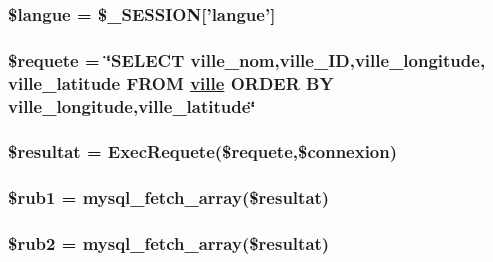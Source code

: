 \hypertarget{distance_8php_a1}{
\subsubsection[\$langue]{\setlength{\rightskip}{0pt plus 5cm}\$langue = \$\_\-SESSION\mbox{[}'langue'\mbox{]}}}
\label{distance_8php_a1}


\hypertarget{distance_8php_a5}{
\subsubsection[\$requete]{\setlength{\rightskip}{0pt plus 5cm}\$requete = \char`\"{}SELECT ville\_\-nom,ville\_\-ID,ville\_\-longitude, ville\_\-latitude FROM \hyperlink{apa__zone_8php_a33}{ville} ORDER BY ville\_\-longitude,ville\_\-latitude\char`\"{}}}
\label{distance_8php_a5}


\hypertarget{distance_8php_a6}{
\subsubsection[\$resultat]{\setlength{\rightskip}{0pt plus 5cm}\$resultat = Exec\-Requete(\$requete,\$connexion)}}
\label{distance_8php_a6}


\hypertarget{distance_8php_a2}{
\subsubsection[\$rub1]{\setlength{\rightskip}{0pt plus 5cm}\$rub1 = mysql\_\-fetch\_\-array(\$resultat)}}
\label{distance_8php_a2}


\hypertarget{distance_8php_a3}{
\subsubsection[\$rub2]{\setlength{\rightskip}{0pt plus 5cm}\$rub2 = mysql\_\-fetch\_\-array(\$resultat)}}
\label{distance_8php_a3}


